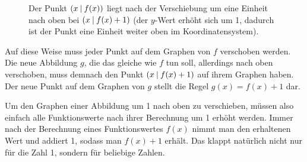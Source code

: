 \documentclass[../../main.tex]{subfiles}
\begin{document}
\begin{figure}[ht]
    \centering
    \caption{Der Punkt $\left(x \:\middle|\: f(x)\right)$ liegt nach der Verschiebung um eine Einheit nach oben bei $\left(x \:\middle|\: f(x)+1\right)$ (der $y$-Wert erhöht sich um 1, dadurch ist der Punkt eine Einheit weiter oben im Koordinatensystem).}
\end{figure}

Auf diese Weise muss jeder Punkt auf dem Graphen von $f$ verschoben werden. Die neue Abbildung $g$, die das gleiche wie $f$ tun soll, allerdings nach oben verschoben, muss demnach den Punkt $\left(x \:\middle|\: f(x)+1\right)$ auf ihrem Graphen haben. Der neue Punkt auf dem Graphen von $g$ stellt die Regel $g(x)=f(x)+1$ dar.

Um den Graphen einer Abbildung um 1 nach oben zu verschieben, müssen also einfach alle Funktionswerte nach ihrer Berechnung um 1 erhöht werden. Immer nach der Berechnung eines Funktionswertes $f(x)$ nimmt man den erhaltenen Wert und addiert 1, sodass man $f(x)+1$ erhält. Das klappt natürlich nicht nur für die Zahl 1, sondern für beliebige Zahlen.
\end{document}
